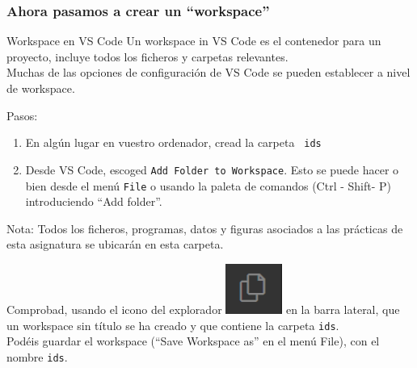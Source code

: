\documentclass[9pt]{beamer}
\newcommand{\workspacefolder}{ids}
\begin{document}
                               \begin{frame}
        \frametitle{Ahora pasamos a crear un ``workspace''}
        \begin{block}{Workspace en VS Code}
          Un workspace in VS Code es el contenedor para un proyecto,
          incluye todos los ficheros y carpetas relevantes.\\
          Muchas de las opciones de configuración de VS Code se pueden
          establecer a nivel de workspace.          
        \end{block}\medskip
        \pause

        {\huge Pasos:}\medskip
        
        \begin{enumerate}
        \item     En algún lugar en vuestro ordenador, cread la carpeta {\tt
            \workspacefolder}
        \item 
        Desde VS Code, escoged {\tt Add Folder to Workspace}. Esto se
        puede hacer o bien desde el menú  {\tt File} o usando la
        paleta de comandos  (Ctrl - Shift- P) introduciendo ``Add folder''.
      \end{enumerate}
      \pause
      \begin{block}{Nota:}
        Todos los ficheros, programas, datos y figuras asociados a las
        prácticas de esta asignatura se ubicarán en esta carpeta.
        
        \end{block}
        \pause
        Comprobad, usando el icono del explorador
        \includegraphics[width=.5cm]{explorer_icon.png} en la barra lateral,
        que un workspace sin título se ha creado y que contiene la carpeta {\tt \workspacefolder}.\\
        Podéis guardar el workspace (``Save Workspace as'' en el menú
        File), con el nombre  {\tt \workspacefolder}.
      \end{frame}
    
\end{document}
